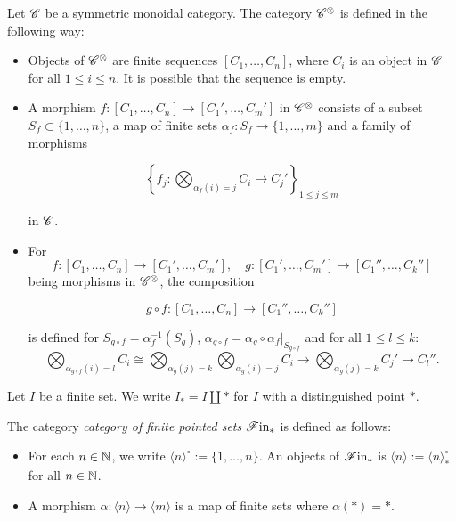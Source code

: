     \begin{defin}\label{Cxdef} Let $\mathscr{C}$ be a symmetric monoidal category. The
        category $\mathscr{C}^{\otimes}$ is defined in the following way:
        \begin{itemize}
            \item Objects of $\mathscr{C}^{\otimes}$ are finite sequences $[C_1, \dots,
            C_n]$, where $C_i$ is an object in $\mathscr{C}$ for all $1 \leq i \leq n$.
            It is possible that the sequence is empty.
            
            \item A morphism $f \colon [C_1, \dots, C_n] \to [C_1', \dots,
            C_m']$ in $\mathscr{C}^{\otimes}$ consists of a subset $S_f \subset \{1, \dots,
            n\}$, a map of finite sets $\alpha_f \colon S_f \to \{1, \dots, m\}$
            and a family of morphisms
            
            $$\left\{f_j \colon \bigotimes_{\alpha_f(i)=j} C_i \to
            C_j'\right\}_{1 \leq j \leq m}$$
            
            in $\mathscr{C}$.
            
            \item For 
            $$f \colon [C_1, \dots, C_n] \to [C_1', \dots, C_m'], \quad g \colon
             [C_1', \dots, C_m'] \to [C_1'', \dots, C_k'']$$ being morphisms in
             $\mathscr{C}^{\otimes}$, the composition
            
            $$g \circ f \colon [C_1, \dots, C_n] \to [C_1'', \dots, C_k'']$$
            
            is defined for $S_{g \circ f} = \alpha_f^{-1}(S_g)$,  $\alpha_{g
            \circ f} = \alpha_g \circ \alpha_f|_{S_{g \circ f}}$ and for all $1
            \leq l \leq k$:
            \[
                \bigotimes_{\alpha_{g \circ f}(i)= l} C_i \cong \bigotimes_{\alpha_g(j)=k} \bigotimes_{\alpha_g(i)=j} C_i \to \bigotimes_{\alpha_g(j)=k} C_j' \to C_l''.
            \]
        \end{itemize}
    \end{defin}

    Let $I$ be a finite set. We write $I_* = I \coprod {*}$ for $I$ with a
    distinguished point $\ast$.

    \begin{defin}
        The category {\em category of finite pointed sets} $\mathscr{F} \text{in}_{\ast}$ is defined as
        follows:
        \begin{itemize}
            \item For each $n \in \mathbb{N}$, we write $\langle n \rangle^{\circ} :=
            \{1, \dots, n\}$. An objects of $\mathscr{F} \text{in}_{\ast}$ is $ \langle n \rangle :=
            \langle n \rangle^{\circ}_*$ for all $n \in \mathbb{N}$.
            \item A morphism $\alpha \colon \langle n \rangle \to \langle m
            \rangle$ is a map of finite sets where $\alpha(*)=*$.
        \end{itemize}
    \end{defin}
    
